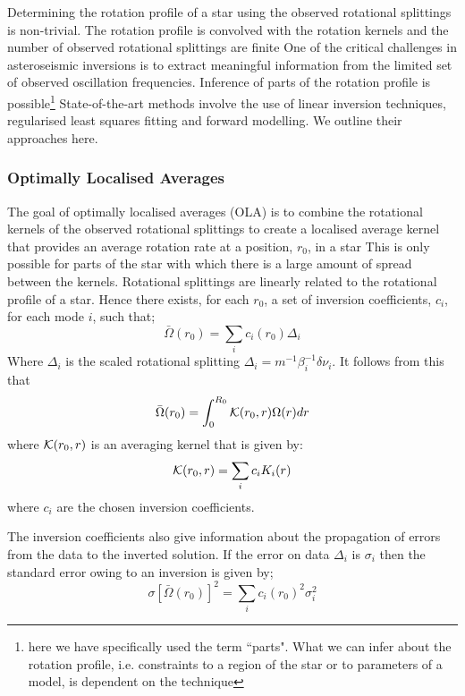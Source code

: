 Determining the rotation profile of a star using the observed rotational splittings is non-trivial.
The rotation profile is convolved with the rotation kernels and the number of observed rotational splittings are finite
One of the critical challenges in asteroseismic inversions is to extract meaningful information from the limited set of observed oscillation frequencies.
Inference of parts of the rotation profile is possible\footnote{here we have specifically used the term ``parts". What we can infer about the rotation profile, i.e. constraints to a region of the star or to parameters of a model, is dependent on the technique}
State-of-the-art methods involve the use of linear inversion techniques, regularised least squares fitting and forward modelling.
We outline their approaches here.

\subsubsection*{Optimally Localised Averages}

The goal of optimally localised averages (OLA) is to combine the rotational kernels of the observed rotational splittings to create a localised average kernel that provides an average rotation rate at a position, $r_0$, in a star
This is only possible for parts of the star with which there is a large amount of spread between the kernels. 
Rotational splittings are linearly related to the rotational profile of a star. Hence there exists, for each $r_0$, a set of inversion coefficients, $c_i$, for each mode $i$, such that;
\begin{equation}
    \bar{\Omega}(r_0) = \sum_i c_i (r_0) \Delta_i    
\end{equation}
Where $\Delta_i$ is the scaled rotational splitting $\Delta_i = m^{-1}\beta_i^{-1} \delta \nu_i$. It follows from this that
\begin{equation}
    \bar{\Omega}(r_0) = \int^{R_0}_0 \mathcal{K}(r_0,r)\Omega(r)d r 
\end{equation}
where $\mathcal{K}(r_0,r)$ is an averaging kernel that is given by:
\begin{equation}
    \mathcal{K}(r_0,r)=\sum_i c_i K_i(r)    
\end{equation}
where $c_i$ are the chosen inversion coefficients.

The inversion coefficients also give information about the propagation of errors from the data to the inverted solution. 
If the error on data $\Delta_i$ is $\sigma_i$ then the standard error owing to an inversion is given by;
\begin{equation}
    \sigma \left[ \bar{\Omega}(r_0)\right]^2 = \sum_i c_i (r_0)^2 \sigma_i^2
\end{equation}

